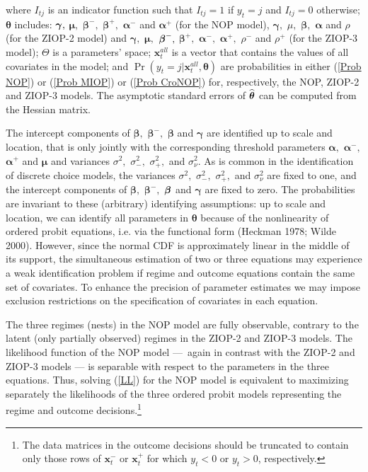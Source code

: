 \documentclass[letterpaper,fleqn,12pt]{article}
\begin{document}
\begin{onehalfspace}
\noindent where $I_{tj}$ is an indicator function such that $I_{tj}=1$ if $%
y_{t}=j$ and $I_{tj}=0$ otherwise; $\mathbf{\theta }$ includes: $\mathbf{%
\gamma ,}$ $\mathbf{\mu ,}$ $\mathbf{\beta }^{-},$ $\mathbf{\beta }^{+},$ $%
\mathbf{\alpha }^{-}$ and $\mathbf{\alpha }^{+}$ (for the NOP model), $%
\mathbf{\gamma },$ $\mu ,$ $\mathbf{\beta },$ $\mathbf{\alpha }$ and $\rho $
(for the ZIOP-2 model) and $\mathbf{\gamma },$ $\mathbf{\mu },$ $\mathbf{%
\beta }^{-},$ $\mathbf{\beta }^{+},$ $\mathbf{\alpha }^{-},$ $\mathbf{\alpha 
}^{+},$ $\rho ^{-}$ and $\rho ^{+}$ (for the ZIOP-3 model); $\Theta $ is a
parameters' space; $\mathbf{x}_{t}^{all}$ is a vector that contains the
values of all covariates in the model; and $\Pr (y_{t}=j|\mathbf{x}%
_{t}^{all},\mathbf{\theta })$ are probabilities in either (\ref{Prob NOP})
or (\ref{Prob MIOP}) or (\ref{Prob CroNOP}) for, respectively, the NOP,
ZIOP-2 and ZIOP-3 models. The asymptotic standard errors of $\widehat{%
\mathbf{\theta }}$ can be computed from the Hessian matrix.

The intercept components of $\mathbf{\beta ,}$ $\mathbf{\beta }^{-},$ $%
\mathbf{\beta }$ and $\mathbf{\gamma }$ are identified up to scale and
location, that is only jointly with the corresponding threshold parameters $%
\mathbf{\alpha ,}$ $\mathbf{\alpha }^{-}\mathbf{,}$ $\mathbf{\alpha }^{+}$
and $\mathbf{\mu }$ and variances $\sigma ^{2},$ $\sigma _{-}^{2},$ $\sigma
_{+}^{2},$ and $\sigma _{\nu }^{2}$. As is common in the identification of
discrete choice models, the variances $\sigma ^{2},$ $\sigma _{-}^{2},$ $%
\sigma _{+}^{2},$ and $\sigma _{\nu }^{2}$ are fixed to one, and the
intercept components of $\mathbf{\beta ,}$ $\mathbf{\beta }^{-},$ $\mathbf{%
\beta }$ and $\mathbf{\gamma }$ are fixed to zero. The probabilities are
invariant to these (arbitrary) identifying assumptions: up to scale and
location, we can identify all parameters in $\mathbf{\theta }$ because of
the nonlinearity of ordered probit equations, i.e. via the functional form
(Heckman 1978; Wilde 2000). However, since the normal CDF is approximately
linear in the middle of its support, the simultaneous estimation of two or
three equations may experience a weak identification problem if regime and
outcome equations contain the same set of covariates. To enhance the
precision of parameter estimates we may impose exclusion restrictions on the
specification of covariates in each equation.

The three regimes (nests) in the NOP model are fully observable, contrary to
the latent (only partially observed) regimes in the ZIOP-2 and ZIOP-3
models. The likelihood function of the NOP model ---\ again in contrast with
the ZIOP-2 and ZIOP-3 models --- is separable with respect to the parameters
in the three equations. Thus, solving (\ref{LL}) for the NOP model is
equivalent to maximizing separately the likelihoods of the three ordered
probit models representing the regime and outcome decisions.\footnote{%
The data matrices in the outcome decisions should be truncated to contain
only those rows of $\mathbf{x}_{t}^{-}$ or $\mathbf{x}_{t}^{+}$ for which $%
y_{t}<0$ or $y_{t}>0$, respectively.}


\end{onehalfspace}
\end{document}
